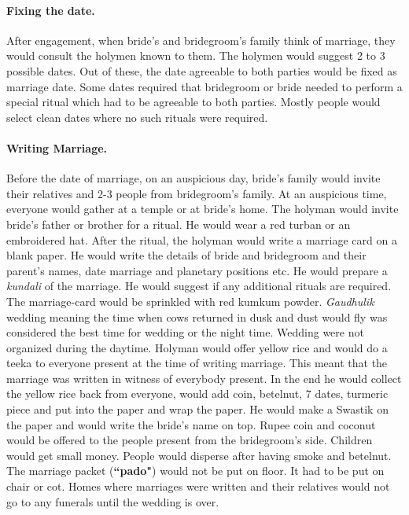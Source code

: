 \paragraph{Fixing the date.} After engagement, when bride's and bridegroom's family
think of marriage, they would consult the holymen known to them. The holymen
would suggest 2 to 3 possible dates. Out of these, the date agreeable to both
parties would be fixed as marriage date. Some dates required that bridegroom or
bride needed to perform a special ritual which had to be agreeable to both
parties. Mostly people would select clean dates where no such rituals were
required. 

\paragraph{Writing Marriage.} Before the date of marriage, on an auspicious day,
bride's family would invite their relatives and 2-3 people from bridegroom's family.
At an auspicious time, everyone would gather at a temple or at bride's home.
The holyman would invite bride's father or brother for a ritual. He would wear a
red turban or an embroidered hat. After the ritual, the holyman would write a
marriage card on a blank paper. He would write the details of bride and bridegroom
and their parent's names, date marriage and planetary positions etc. He would
prepare a \textit{kundali} of the marriage. He would suggest if any additional
rituals are required. The marriage-card would be sprinkled with red kumkum
powder. \textit{Gaudhulik} wedding meaning the time when cows returned in dusk
and dust would fly was considered the best time for wedding or the night time.
Wedding were not organized during the daytime. Holyman would offer yellow rice
and would do a teeka to everyone present at the time of writing marriage. This
meant that the marriage was written in witness of everybody present. In the end
he would collect the yellow rice back from everyone, would add coin, betelnut,
7 dates, turmeric piece and put into the paper and wrap the paper. He would
make a Swastik on the paper and would write the bride's name on top. Rupee coin
and coconut would be offered to the people present from the bridegroom's side.
Children would get small money. People would disperse after having smoke and
betelnut. The marriage packet (\textbf{``pado"}) would not be put on floor. It
had to be put on chair or cot. Homes where marriages were written and their
relatives would not go to any funerals until the wedding is over.

